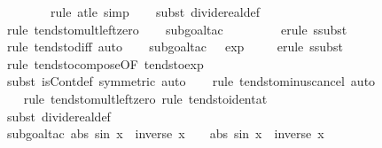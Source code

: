 \documentclass[leqno]{article}
\theoremstyle{definition}
\begin{document}
\begin{figure}
\begin{isabellebody}
\ \ \isamarkupfalse%
\ {}\isanewline
\ \ \isamarkupfalse%
\ {\isacharparenleft}rule\ at{\isacharunderscore}le{\isacharcomma}\ simp{\isacharparenright}\isanewline
\ \ \isamarkupfalse%
\ {\isacharparenleft}subst\ divide{\isacharunderscore}real{\isacharunderscore}def{\isacharparenright}\isanewline
\ \ \isamarkupfalse%
\ {\isacharparenleft}rule\ tendsto{\isacharunderscore}mult{\isacharunderscore}left{\isacharunderscore}zero{\isacharparenright}{\isacharplus}\isanewline
\ \ \isamarkupfalse%
\ {\isacharparenleft}subgoal{\isacharunderscore}tac\ {\isachardoublequoteopen}{}\ {\isacharequal}\ {}\ {\isacharminus}\ {}{\isachardoublequoteclose}{\isacharparenright}\isanewline
\ \ \isamarkupfalse%
\ {\isacharparenleft}erule\ ssubst{\isacharparenright}\isanewline
\ \ \isamarkupfalse%
\ {\isacharparenleft}rule\ tendsto{\isacharunderscore}diff{\isacharcomma}\ auto{\isacharparenright}\isanewline
\ \ \isamarkupfalse%
\ {\isacharparenleft}subgoal{\isacharunderscore}tac\ {\isachardoublequoteopen}{}\ {\isacharequal}\ exp\ {}{\isachardoublequoteclose}{\isacharparenright}\isanewline
\ \ \isamarkupfalse%
\ {\isacharparenleft}erule\ ssubst{\isacharparenright}\isanewline
\ \ \isamarkupfalse%
\ {\isacharparenleft}rule\ tendsto{\isacharunderscore}compose{\isacharbrackleft}OF\ tendsto{\isacharunderscore}exp{\isacharbrackright}{\isacharparenright}\isanewline
\ \ \isamarkupfalse%
\ {\isacharparenleft}subst\ isCont{\isacharunderscore}def\ {\isacharbrackleft}symmetric{\isacharbrackright}{\isacharcomma}\ auto{\isacharparenright}\isanewline
\ \ \isamarkupfalse%
\ {\isacharparenleft}rule\ tendsto{\isacharunderscore}minus{\isacharunderscore}cancel{\isacharcomma}\ auto{\isacharparenright}\isanewline
\ \ \isamarkupfalse%
\ {\isacharparenleft}rule\ tendsto{\isacharunderscore}mult{\isacharunderscore}left{\isacharunderscore}zero{\isacharcomma}\ rule\ tendsto{\isacharunderscore}ident{\isacharunderscore}at{\isacharparenright}\isanewline
\ \ \isanewline
\ \ \isamarkupfalse%
\ {\isacharparenleft}subst\ divide{\isacharunderscore}real{\isacharunderscore}def{\isacharparenright}{\isacharplus}\isanewline
\ \ \isamarkupfalse%
\ {\isacharparenleft}subgoal{\isacharunderscore}tac\ {\isachardoublequoteopen}abs\ {\isacharparenleft}sin\ x{\isacharparenright}\ {\isacharasterisk}\ inverse\ x\ {\isacharequal}\ {}\ {\isacharasterisk}\ abs\ {\isacharparenleft}sin\ x{\isacharparenright}\ {\isacharasterisk}\ inverse\ x{\isachardoublequoteclose}{\isacharparenright}\isanewline

\end{isabellebody}
\end{figure}
\end{document}
